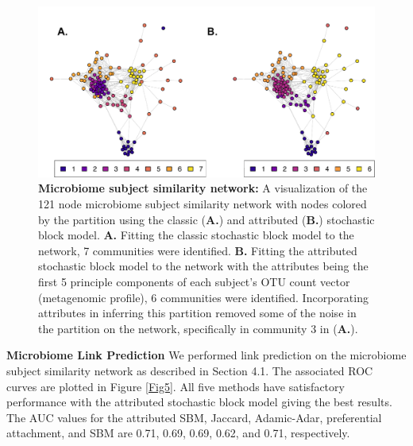 \begin{figure}[h!]
\begin{center}
\includegraphics[width=1\textwidth]{MicrobiomeNets_May6.pdf}
\caption{{\bf Microbiome subject similarity network:} A visualization of the 121 node microbiome subject similarity network with nodes colored by the partition using the classic ({\bf A.}) and attributed ({\bf B.}) stochastic block model. {\bf A.} Fitting the classic stochastic block model to the network, 7 communities were identified. {\bf B.} Fitting the attributed stochastic block model to the network with the attributes being the first 5 principle components of each subject's OTU count vector (metagenomic profile), 6 communities were identified. Incorporating attributes in inferring this partition removed some of the noise in the partition on the network, specifically in community 3 in ({\bf A.}).}
\label{Fig4}
\end{center}
\end{figure}

{\bf Microbiome Link Prediction}
We performed link prediction on the microbiome subject similarity network as described in Section 4.1. The associated ROC curves are plotted in Figure \ref{Fig5}. All five methods have satisfactory performance with the attributed stochastic block model giving the best results. The AUC values for the attributed SBM, Jaccard, Adamic-Adar, preferential attachment, and SBM are 0.71, 0.69, 0.69, 0.62, and 0.71, respectively. 
 
